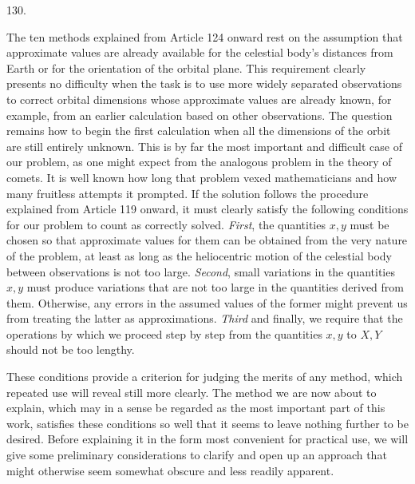 \par{}\medskip
\begin{center}\hypertarget{native-177-article130}{}130.\end{center}
The ten methods explained from Article 124 onward rest on the assumption that approximate
values are already available for the celestial body's distances from Earth or for the orientation of
the orbital plane. This requirement clearly presents no difficulty when the task is to use more
widely separated observations to correct orbital dimensions whose approximate values are already
known, for example, from an earlier calculation based on other observations. The question remains
how to begin the first calculation when all the dimensions of the orbit are still entirely unknown.
This is by far the most important and difficult case of our problem, as one might expect from the
analogous problem in the theory of comets. It is well known how long that problem vexed
mathematicians and how many fruitless attempts it prompted. If the solution follows the procedure
explained from Article 119 onward, it must clearly satisfy the following conditions for our problem
to count as correctly solved. \emph{First}, the quantities $x,y$ must be chosen so that approximate
values for them can be obtained from the very nature of the problem, at least as long as the
heliocentric motion of the celestial body between observations is not too large. \emph{Second},
small variations in the quantities $x,y$ must produce variations that are not too large in the
quantities derived from them. Otherwise, any errors in the assumed values of the former might
prevent us from treating the latter as approximations. \emph{Third} and finally, we require that the
operations by which we proceed step by step from the quantities $x,y$ to $X,Y$ should not be too
lengthy.

These conditions provide a criterion for judging the merits of any method, which repeated use will
reveal still more clearly. The method we are now about to explain, which may in a sense be regarded
as the most important part of this work, satisfies these conditions so well that it seems to
leave nothing further to be desired. Before explaining it in the form most convenient for
practical use, we will give some preliminary considerations to clarify and open up an approach that
might otherwise seem somewhat obscure and less readily apparent.

